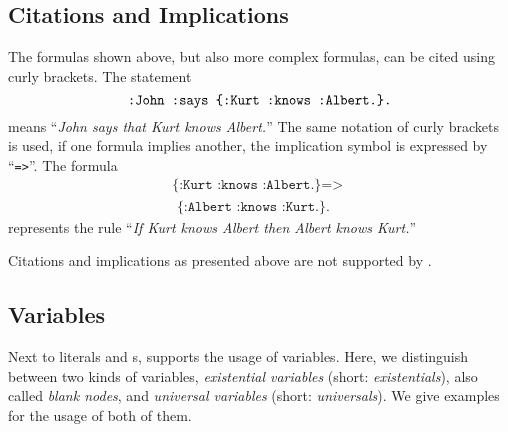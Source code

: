 \subsection{Citations and Implications}\label{reffor}
The formulas shown above, but also more complex formulas, can be cited using curly brackets. 
The statement
\begin{equation}\label{ref}
 \verb!:John :says {:Kurt :knows :Albert.}.!
\end{equation}
means ``\textit{John says that Kurt knows Albert.}''
The same notation of curly brackets is used, if one formula implies another,
 the implication symbol is expressed by ``\verb!=>!''. The formula
%
\begin{multline}%
 \texttt{\{:Kurt :knows :Albert.\} => }%
\\ \texttt{ \{:Albert :knows :Kurt.\}.}\label{implex}
\end{multline}
represents the rule ``\textit{If Kurt knows Albert then Albert knows Kurt.}''

Citations and implications as presented above are not supported by \rdf.

\subsection{Variables}
Next to literals and \iri{}s, \nthree supports the usage of variables. Here, we distinguish between two kinds of variables, \emph{existential variables} (short: \emph{existentials}),
also called \emph{blank nodes}, and \emph{universal variables} (short: \emph{universals}).
We give examples for the usage of both of them.


